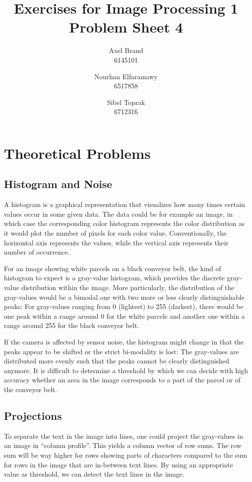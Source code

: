 \documentclass[a4paper,twocolumn]{article}
\title{\textbf{Exercises for Image Processing 1}\\Problem Sheet 4}
\author{Axel Brand\\6145101 \and Nourhan Elfaramawy\\6517858 \and Sibel Toprak\\6712316}
\begin{document}
	\maketitle
	
	\section{Theoretical Problems}
	
	\subsection{Histogram and Noise}
	
	A histogram is a graphical representation that visualizes how many times certain values occur in some given data. The data could be for example an image, in which case the corresponding color histogram represents the color distribution as it would plot the number of pixels for each color value. Conventionally, the horizontal axis represents the values, while the vertical axis represents their number of occurrence.
	
	For an image showing white parcels on a black conveyor belt, the kind of histogram to expect is a gray-value histogram, which provides the discrete gray-value distribution within the image. More particularly, the distribution of the gray-values would be a bimodal one with two more or less clearly distinguishable peaks: For gray-values ranging from 0 (lightest) to 255 (darkest), there would be one peak within a range around 0 for the white parcels and another one within a range around 255 for the black conveyor belt.
	
	If the camera is affected by sensor noise, the histogram might change in that the peaks appear to be shifted or the strict bi-modality is lost: The gray-values are distributed more evenly such that the peaks cannot be clearly distinguished anymore. It is difficult to determine a threshold by which we can decide with high accuracy whether an area in the image corresponds to a part of the parcel or of the conveyor belt.
	
	\subsection{Projections}
		
	To separate the text in the image into lines, one could project the gray-values in an image in ``column profile''. This yields a column vector of row sums. The row sum will be way higher for rows showing parts of characters compared to the sum for rows in the image that are in-between text lines. By using an appropriate value as threshold, we can detect the text lines in the image.
	
\end{document}
